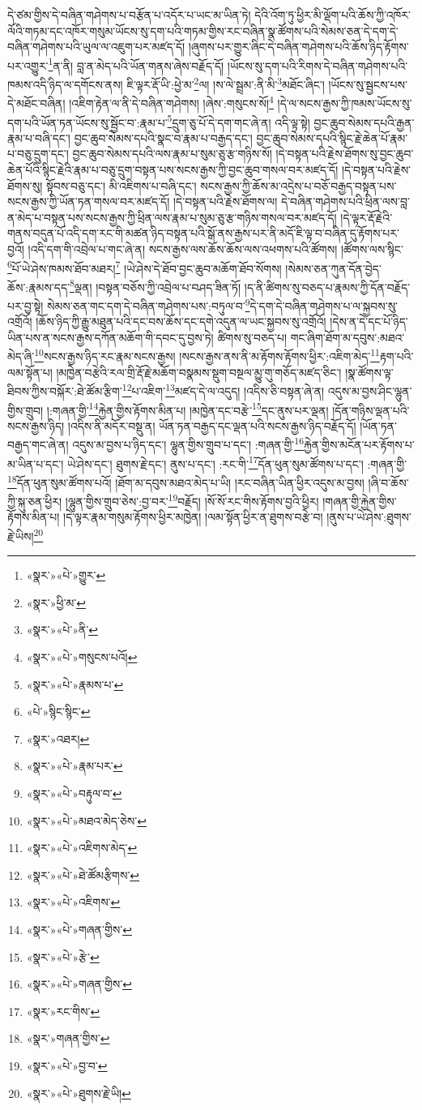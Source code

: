 དེ་ཙམ་གྱིས་དེ་བཞིན་གཤེགས་པ་བརྩོན་པ་འདོར་པ་ཡང་མ་ཡིན་ཏེ། དེའི་འོག་ཏུ་ཕྱིར་མི་ལྡོག་པའི་ཆོས་ཀྱི་འཁོར་ལོའི་གཏམ་དང་འཁོར་གསུམ་ཡོངས་སུ་དག་པའི་གཏམ་གྱིས་རང་བཞིན་སྣ་ཚོགས་པའི་སེམས་ཅན་དེ་དག་དེ་བཞིན་གཤེགས་པའི་ཡུལ་ལ་འཇུག་པར་མཛད་དོ། །ཞུགས་པར་གྱུར་ཞིང་དེ་བཞིན་གཤེགས་པའི་ཆོས་ཉིད་རྟོགས་པར་འགྱུར་\footnote{«སྣར་»«པེ་»གྱུར་}ན་ནི། བླ་ན་མེད་པའི་ཡོན་གནས་ཞེས་བརྗོད་དོ། །ཡོངས་སུ་དག་པའི་རིགས་དེ་བཞིན་གཤེགས་པའི་ཁམས་འདི་ཉིད་ལ་དགོངས་ནས། ཇི་ལྟར་རྡོ་ཡི་:ཕྱེ་མ་\footnote{«སྣར་»ཕྱི་མ་}ལ། །ས་ལེ་སྦྲམ་:ནི་མི་\footnote{«སྣར་»«པེ་»ནི་}མཐོང་ཞིང་། །ཡོངས་སུ་སྦྱངས་པས་དེ་མཐོང་བཞིན། །འཇིག་རྟེན་ལ་ནི་དེ་བཞིན་གཤེགས། །ཞེས་:གསུངས་སོ།\footnote{«སྣར་»«པེ་»གསུངས་པའོ།} །དེ་ལ་སངས་རྒྱས་ཀྱི་ཁམས་ཡོངས་སུ་དག་པའི་ཡོན་ཏན་ཡོངས་སུ་སྦྱོང་བ་:རྣམ་པ་\footnote{«སྣར་»«པེ་»རྣམས་པ་}དྲུག་ཅུ་པོ་དེ་དག་གང་ཞེ་ན། འདི་ལྟ་སྟེ། བྱང་ཆུབ་སེམས་དཔའི་རྒྱན་རྣམ་པ་བཞི་དང་། བྱང་ཆུབ་སེམས་དཔའི་སྣང་བ་རྣམ་པ་བརྒྱད་དང་། བྱང་ཆུབ་སེམས་དཔའི་སྙིང་རྗེ་ཆེན་པོ་རྣམ་པ་བཅུ་དྲུག་དང་། བྱང་ཆུབ་སེམས་དཔའི་ལས་རྣམ་པ་སུམ་ཅུ་རྩ་གཉིས་སོ། །དེ་བསྟན་པའི་རྗེས་ཐོགས་སུ་བྱང་ཆུབ་ཆེན་པོའི་སྙིང་རྗེའི་རྣམ་པ་བཅུ་དྲུག་བསྟན་པས་སངས་རྒྱས་ཀྱི་བྱང་ཆུབ་གསལ་བར་མཛད་དོ། །དེ་བསྟན་པའི་རྗེས་ཐོགས་སུ། སྟོབས་བཅུ་དང་། མི་འཇིགས་པ་བཞི་དང་། སངས་རྒྱས་ཀྱི་ཆོས་མ་འདྲེས་པ་བཅོ་བརྒྱད་བསྟན་པས་སངས་རྒྱས་ཀྱི་ཡོན་ཏན་གསལ་བར་མཛད་དོ། །དེ་བསྟན་པའི་རྗེས་ཐོགས་ལ། དེ་བཞིན་གཤེགས་པའི་ཕྲིན་ལས་བླ་ན་མེད་པ་བསྟན་པས་སངས་རྒྱས་ཀྱི་ཕྲིན་ལས་རྣམ་པ་སུམ་ཅུ་རྩ་གཉིས་གསལ་བར་མཛད་དོ། །དེ་ལྟར་རྡོ་རྗེའི་གནས་བདུན་པོ་འདི་དག་རང་གི་མཚན་ཉིད་བསྟན་པའི་སྒོ་ནས་རྒྱས་པར་ནི་མདོ་ཇི་ལྟ་བ་བཞིན་དུ་རྟོགས་པར་བྱའོ། །འདི་དག་གི་འབྲེལ་པ་གང་ཞེ་ན། སངས་རྒྱས་ལས་ཆོས་ཆོས་ལས་འཕགས་པའི་ཚོགས། །ཚོགས་ལས་སྙིང་\footnote{«པེ་»སྙིང་སྙིང་}པོ་ཡེ་ཤེས་ཁམས་ཐོབ་མཐར།\footnote{«སྣར་»འཐར།} །ཡེ་ཤེས་དེ་ཐོབ་བྱང་ཆུབ་མཆོག་ཐོབ་སོགས། །སེམས་ཅན་ཀུན་དོན་བྱེད་ཆོས་:རྣམས་དད་\footnote{«སྣར་»«པེ་»རྣམ་པར་}ལྡན། །བསྟན་བཅོས་ཀྱི་འབྲེལ་པ་བཤད་ཟིན་ཏོ། །ད་ནི་ཚིགས་སུ་བཅད་པ་རྣམས་ཀྱི་དོན་བརྗོད་པར་བྱ་སྟེ། སེམས་ཅན་གང་དག་དེ་བཞིན་གཤེགས་པས་:བཏུལ་བ་\footnote{«སྣར་»«པེ་»བརྟུལ་བ་}དེ་དག་དེ་བཞིན་གཤེགས་པ་ལ་སྐྱབས་སུ་འགྲོའོ། །ཆོས་ཉིད་ཀྱི་རྒྱུ་མཐུན་པའི་དང་བས་ཆོས་དང་དགེ་འདུན་ལ་ཡང་སྐྱབས་སུ་འགྲོའོ། །དེས་ན་དེ་དང་པོ་ཉིད་ཡིན་པས་ན་སངས་རྒྱས་དཀོན་མཆོག་གི་དབང་དུ་བྱས་ཏེ། ཚིགས་སུ་བཅད་པ། གང་ཞིག་ཐོག་མ་དབུས་:མཐའ་མེད་ཞི་\footnote{«སྣར་»«པེ་»མཐའ་མེད་ཅེས་}སངས་རྒྱས་ཉིད་རང་རྣམ་སངས་རྒྱས། །སངས་རྒྱས་ནས་ནི་མ་རྟོགས་རྟོགས་ཕྱིར་:འཇིག་མེད་\footnote{«སྣར་»«པེ་»འཇིགས་མེད་}རྟག་པའི་ལམ་སྟོན་པ། །མཁྱེན་བརྩེའི་རལ་གྲི་རྡོ་རྗེ་མཆོག་བསྣམས་སྡུག་བསྔལ་མྱུ་གུ་གཅོད་མཛད་ཅིང་། །སྣ་ཚོགས་ལྟ་ཐིབས་ཀྱིས་བསྐོར་:ཐེ་ཚོམ་རྩིག་\footnote{«སྣར་»«པེ་»ཐེ་ཚོམརྩིགས་}པ་འཇིག་\footnote{«སྣར་»«པེ་»འཇིགས་}མཛད་དེ་ལ་འདུད། །འདིས་ཅི་བསྟན་ཞེ་ན། འདུས་མ་བྱས་ཤིང་ལྷུན་གྱིས་གྲུབ། །:གཞན་གྱི་\footnote{«སྣར་»«པེ་»གཞན་གྱིས་}རྐྱེན་གྱིས་རྟོགས་མིན་པ། །མཁྱེན་དང་བརྩེ་\footnote{«སྣར་»«པེ་»རྩེ་}དང་ནུས་པར་ལྡན། །དོན་གཉིས་ལྡན་པའི་སངས་རྒྱས་ཉིད། །འདིས་ནི་མདོར་བསྡུ་ན། ཡོན་ཏན་བརྒྱད་དང་ལྡན་པའི་སངས་རྒྱས་ཉིད་བརྗོད་དོ། །ཡོན་ཏན་བརྒྱད་གང་ཞེ་ན། འདུས་མ་བྱས་པ་ཉིད་དང་། ལྷུན་གྱིས་གྲུབ་པ་དང་། :གཞན་གྱི་\footnote{«སྣར་»«པེ་»གཞན་གྱིས་}རྐྱེན་གྱིས་མངོན་པར་རྟོགས་པ་མ་ཡིན་པ་དང་། ཡེ་ཤེས་དང་། ཐུགས་རྗེ་དང་། ནུས་པ་དང་། :རང་གི་\footnote{«སྣར་»རང་གིས་}དོན་ཕུན་སུམ་ཚོགས་པ་དང་། :གཞན་གྱི་\footnote{«སྣར་»གཞན་གྱིས་}དོན་ཕུན་སུམ་ཚོགས་པའོ། །ཐོག་མ་དབུས་མཐའ་མེད་པ་ཡི། །རང་བཞིན་ཡིན་ཕྱིར་འདུས་མ་བྱས། །ཞི་བ་ཆོས་ཀྱི་སྐུ་ཅན་ཕྱིར། །ལྷུན་གྱིས་གྲུབ་ཅེས་:བྱ་བར་\footnote{«སྣར་»«པེ་»བྱ་བ་}བརྗོད། །སོ་སོ་རང་གིས་རྟོགས་བྱའི་ཕྱིར། །གཞན་གྱི་རྐྱེན་གྱིས་རྟོགས་མིན་པ། །དེ་ལྟར་རྣམ་གསུམ་རྟོགས་ཕྱིར་མཁྱེན། །ལམ་སྟོན་ཕྱིར་ན་ཐུགས་བརྩེ་བ། །ནུས་པ་ཡེ་ཤེས་:ཐུགས་རྗེ་ཡིས།\footnote{«སྣར་»«པེ་»ཐུགས་རྗེ་ཡི།} 